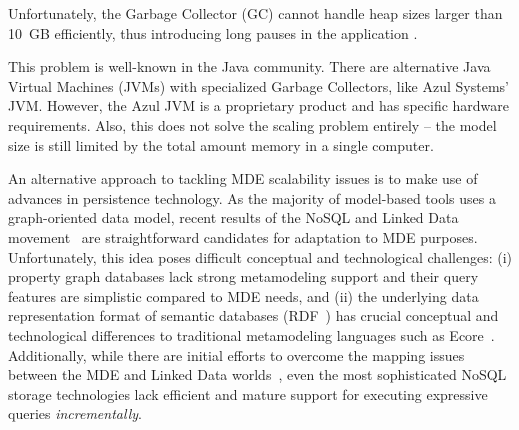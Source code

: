 Unfortunately, the Garbage Collector (GC) cannot handle heap sizes larger than 10~GB efficiently, thus introducing long pauses in the application \cite{Azul}. 

This problem is well-known in the Java community. There are alternative Java Virtual Machines (JVMs) with specialized Garbage Collectors, like Azul Systems' JVM. However, the Azul JVM is a proprietary product and has specific hardware requirements. Also, this does not solve the scaling problem entirely -- the model size is still limited by the total amount memory in a single computer.

An alternative approach to tackling MDE scalability issues is to make use of advances in persistence technology. As the majority of model-based tools uses a graph-oriented data model, recent results of the NoSQL and Linked Data movement~\cite{neo4j,openvirtuoso,sesame} are straightforward candidates for adaptation to MDE purposes. Unfortunately, this idea poses difficult conceptual and technological challenges: (i) property graph databases lack strong metamodeling support and their query features are simplistic compared to MDE needs, and (ii) the underlying data representation format of semantic databases (RDF~\cite{website:rdf_standard}) has crucial conceptual and technological differences to traditional metamodeling languages such as Ecore~\cite{EMF}. Additionally, while there are initial efforts to overcome the mapping issues between the MDE and Linked Data worlds~\cite{hillairet2008bridging}, even the most sophisticated NoSQL storage technologies lack efficient and mature support for executing expressive queries \emph{incrementally}.



